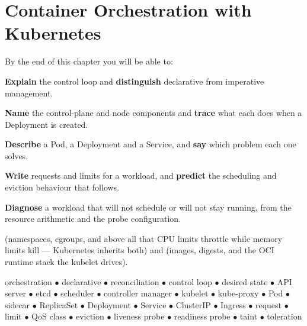 \chapter{Container Orchestration with Kubernetes}\label{ch:kubernetes}

\begin{outcomes}
By the end of this chapter you will be able to:
\begin{tight}
  \item \textbf{Explain} the control loop and \textbf{distinguish} declarative
        from imperative management.
  \item \textbf{Name} the control-plane and node components and \textbf{trace}
        what each does when a Deployment is created.
  \item \textbf{Describe} a Pod, a Deployment and a Service, and \textbf{say}
        which problem each one solves.
  \item \textbf{Write} requests and limits for a workload, and \textbf{predict}
        the scheduling and eviction behaviour that follows.
  \item \textbf{Diagnose} a workload that will not schedule or will not stay
        running, from the resource arithmetic and the probe configuration.
\end{tight}
\end{outcomes}

\begin{prereq}
 (namespaces, cgroups, and above all that CPU limits throttle
while memory limits kill --- Kubernetes inherits both) and 
(images, digests, and the OCI runtime stack the kubelet drives).
\end{prereq}

\begin{keyterms}
orchestration $\bullet$ declarative $\bullet$ reconciliation $\bullet$ control
loop $\bullet$ desired state $\bullet$ API server $\bullet$ etcd $\bullet$
scheduler $\bullet$ controller manager $\bullet$ kubelet $\bullet$ kube-proxy
$\bullet$ Pod $\bullet$ sidecar $\bullet$ ReplicaSet $\bullet$ Deployment
$\bullet$ Service $\bullet$ ClusterIP $\bullet$ Ingress $\bullet$ request
$\bullet$ limit $\bullet$ QoS class $\bullet$ eviction $\bullet$ liveness probe
$\bullet$ readiness probe $\bullet$ taint $\bullet$ toleration
\end{keyterms}

